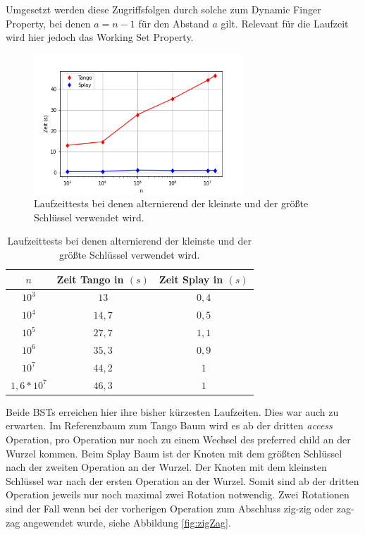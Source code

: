 \documentclass[a4paper,12pt]{article}
\begin{document}
\noindent Umgesetzt werden diese Zugriffsfolgen durch solche zum Dynamic Finger Property, bei denen $a = n -1$ für den Abstand $a$ gilt. Relevant für die Laufzeit wird hier jedoch das Working Set Property.

\begin{figure}[H]
	\centering
	\includegraphics[width=0.7\textwidth]{Medien/laufzeittest/diagramm/kleinGros}
	\caption{Laufzeittests bei denen alternierend der kleinste und der größte Schlüssel verwendet wird.}
\end{figure}
\begin{table}[H]
	\begin{center}
		\begin{tabular}[c]{|c|c|c|}
			\hline
			$n$ & Zeit Tango in $\left(s\right)$ &Zeit Splay in $\left(s\right)$ \\
			\hline
			$10^3$ & $13$ &$0,4$ \\
			\hline
			$10^4$  & $14,7$ &$0,5$  \\
			\hline
			$10^5$  & $27,7$ &$1,1$  \\
			\hline
			$10^6$  & $35,3$ &$0,9$  \\
			\hline
			$10^7$  & $44,2$ &$1$  \\
			\hline
			$1,6 *10^7$  & $46,3$ &$1$  \\
			\hline
		\end{tabular}
		\caption{Laufzeittests bei denen alternierend der kleinste und der größte Schlüssel verwendet wird.} 
	\end{center}
\end{table}
\noindent Beide BSTs erreichen hier ihre bisher kürzesten Laufzeiten. Dies war auch zu erwarten. Im Referenzbaum zum Tango Baum wird es ab der dritten \textit{access} Operation, pro Operation nur noch zu einem Wechsel des preferred child an der Wurzel kommen. Beim Splay Baum ist der Knoten mit dem größten Schlüssel nach der zweiten Operation an der Wurzel. Der Knoten mit dem kleinsten Schlüssel war nach der ersten Operation an der Wurzel. Somit sind ab der dritten Operation jeweils nur noch maximal zwei Rotation notwendig. Zwei Rotationen sind der Fall wenn bei der vorherigen Operation zum Abschluss zig-zig oder zag-zag angewendet wurde, siehe Abbildung \ref{fig:zigZag}.
 
\end{document}
